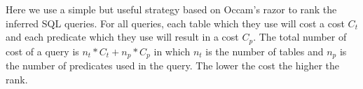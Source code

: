 Here we use a simple but useful strategy based on Occam's razor to rank the inferred SQL queries. For all queries, each table which they use will cost a cost $C_t$ and each predicate which they use will result in a cost $C_p$. The total number of cost of a query is $n_t*C_t+n_p*C_p$ in which $n_t$ is the number of tables and $n_p$ is the number of predicates used in the query. The lower the cost the higher the rank.


